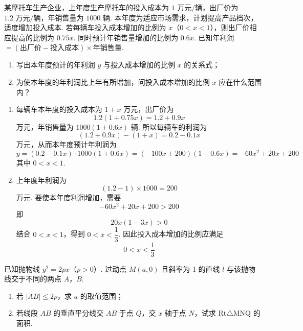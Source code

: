 \begin{problem}
某摩托车生产企业，上年度生产摩托车的投入成本为 \(1\text{ 万元/辆}\)，出厂价为 \(1.2\text{ 万元/辆}\)，年销售量为 \(1000\text{ 辆}\). 本年度为适应市场需求，计划提高产品档次，适度增加投入成本. 若每辆车投入成本增加的比例为 \(x\)（\(0 < x < 1\)），则出厂价相应提高的比例为 \(0.75x\). 同时预计年销售量增加的比例为 \(0.6x\). 已知年利润 \(=(\text{出厂价} - \text{投入成本}) \times \text{年销售量}\).

\begin{enumerate}
\item 写出本年度预计的年利润 \(y\) 与投入成本增加的比例 \(x\) 的关系式；
\item 为使本年度的年利润比上年有所增加，问投入成本增加的比例 \(x\) 应在什么范围内？
\end{enumerate}
\end{problem}

\begin{solution}
\begin{enumerate}
\item 每辆车本年度的投入成本为 \(1+x\) 万元，出厂价为
\[
1.2(1+0.75x)=1.2+0.9x
\]
万元，年销售量为 \(1000(1+0.6x)\) 辆. 所以每辆车的利润为
\[
(1.2+0.9x)-(1+x)=0.2-0.1x
\]
万元，从而本年度预计年利润为
\[
y=(0.2-0.1x)\cdot1000(1+0.6x)
=(-100x+200)(1+0.6x)
=-60x^2+20x+200
\]
其中 \(0<x<1\).
\item 上年度年利润为
\[
(1.2-1)\times1000=200
\]
万元. 要使本年度利润增加，需要
\[
-60x^2+20x+200>200
\]
即
\[
20x(1-3x)>0
\]
结合 \(0<x<1\)，得到 \(0<x<\dfrac13\). 因此投入成本增加的比例应满足
\[
0<x<\frac13
\]
\end{enumerate}
\end{solution}

\begin{problem}
已知抛物线 \(y^{2} = 2px\)（\(p > 0\)）. 过动点 \(M(a, 0)\) 且斜率为 1 的直线 \(l\) 与该抛物线交于不同的两点 \(A\)，\(B\).

\begin{enumerate}
\item 若 \(\left|AB\right| \leqslant 2p\)，求 \(a\) 的取值范围；
\item 若线段 \(AB\) 的垂直平分线交 \(AB\) 于点 \(Q\)，交 \(x\) 轴于点 \(N\)，试求 \(\mathrm{Rt}\triangle\mathrm{MNQ}\) 的面积.
\end{enumerate}
\end{problem}

